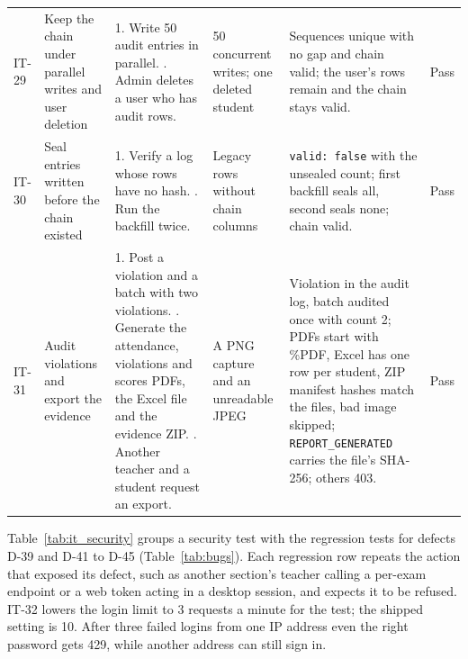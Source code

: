 {\begin{longtable}{@{}P{1.1cm}P{2.5cm}P{3.5cm}P{2.6cm}P{2.9cm}>{\centering\arraybackslash}p{1.8cm}@{}}
IT-29 & Keep the chain under parallel writes and user deletion & 1. Write 50 audit entries in parallel. . Admin deletes a user who has audit rows. & 50 concurrent writes; one deleted student  & Sequences unique with no gap and chain valid; the user's rows remain and the chain stays valid. & Pass\\
IT-30 & Seal entries written before the chain existed & 1. Verify a log whose rows have no hash. . Run the backfill twice. & Legacy rows without chain columns  & \texttt{valid: false} with the unsealed count; first backfill seals all, second seals none; chain valid. & Pass\\
IT-31 & Audit violations and export the evidence & 1. Post a violation and a batch with two violations. . Generate the attendance, violations and scores PDFs, the Excel file and the evidence ZIP. . Another teacher and a student request an export. & A PNG capture and an unreadable JPEG  & Violation in the audit log, batch audited once with count 2; PDFs start with \%PDF, Excel has one row per student, ZIP manifest hashes match the files, bad image skipped; \texttt{REPORT\_\allowbreak{}GENERATED} carries the file's SHA-256; others 403. & Pass\\
\end{longtable}}

Table~\ref{tab:it_security} groups a security test with the regression tests for defects D-39 and D-41 to D-45 (Table~\ref{tab:bugs}). Each regression row repeats the action that exposed its defect, such as another section's teacher calling a per-exam endpoint or a web token acting in a desktop session, and expects it to be refused. IT-32 lowers the login limit to 3 requests a minute for the test; the shipped setting is 10. After three failed logins from one IP address even the right password gets 429, while another address can still sign in.

